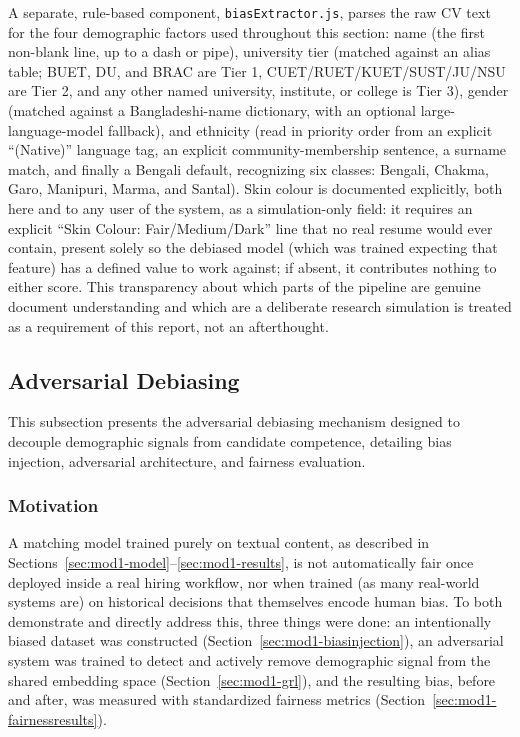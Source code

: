 \documentclass[11pt,a4paper]{article}
\newcommand{\code}[1]{\texttt{\footnotesize #1}}
\begin{document}
A separate, rule-based component, \code{biasExtractor.js}, parses the raw CV text for the four demographic factors used throughout this section: name (the first non-blank line, up to a dash or pipe), university tier (matched against an alias table; BUET, DU, and BRAC are Tier 1, CUET/RUET/KUET/SUST/JU/NSU are Tier 2, and any other named university, institute, or college is Tier 3), gender (matched against a Bangladeshi-name dictionary, with an optional large-language-model fallback), and ethnicity (read in priority order from an explicit ``(Native)'' language tag, an explicit community-membership sentence, a surname match, and finally a Bengali default, recognizing six classes: Bengali, Chakma, Garo, Manipuri, Marma, and Santal). Skin colour is documented explicitly, both here and to any user of the system, as a simulation-only field: it requires an explicit ``Skin Colour: Fair/Medium/Dark'' line that no real resume would ever contain, present solely so the debiased model (which was trained expecting that feature) has a defined value to work against; if absent, it contributes nothing to either score. This transparency about which parts of the pipeline are genuine document understanding and which are a deliberate research simulation is treated as a requirement of this report, not an afterthought.

\subsection{Adversarial Debiasing}
\label{sec:mod1-debias}

This subsection presents the adversarial debiasing mechanism designed to decouple demographic signals from candidate competence, detailing bias injection, adversarial architecture, and fairness evaluation.

\subsubsection{Motivation}

A matching model trained purely on textual content, as described in Sections~\ref{sec:mod1-model}--\ref{sec:mod1-results}, is not automatically fair once deployed inside a real hiring workflow, nor when trained (as many real-world systems are) on historical decisions that themselves encode human bias. To both demonstrate and directly address this, three things were done: an intentionally biased dataset was constructed (Section~\ref{sec:mod1-biasinjection}), an adversarial system was trained to detect and actively remove demographic signal from the shared embedding space (Section~\ref{sec:mod1-grl}), and the resulting bias, before and after, was measured with standardized fairness metrics (Section~\ref{sec:mod1-fairnessresults}).
\end{document}
